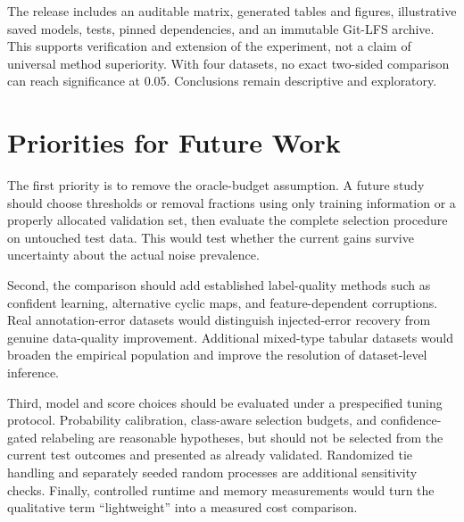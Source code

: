 The release includes an auditable matrix, generated tables and figures,
illustrative saved models, tests, pinned dependencies, and an immutable
Git-LFS archive. This supports verification and extension of the experiment,
not a claim of universal method superiority. With four datasets, no exact
two-sided comparison can reach significance at 0.05. Conclusions remain
descriptive and exploratory.

\section{Priorities for Future Work}
The first priority is to remove the oracle-budget assumption. A future study
should choose thresholds or removal fractions using only training information
or a properly allocated validation set, then evaluate the complete selection
procedure on untouched test data. This would test whether the current gains
survive uncertainty about the actual noise prevalence.

Second, the comparison should add established label-quality methods such as
confident learning, alternative cyclic maps, and feature-dependent corruptions.
Real annotation-error datasets would distinguish injected-error recovery from
genuine data-quality improvement. Additional mixed-type tabular datasets
would broaden the empirical population and improve the resolution of
dataset-level inference.

Third, model and score choices should be evaluated under a prespecified tuning
protocol. Probability calibration, class-aware selection budgets, and
confidence-gated relabeling are reasonable hypotheses, but should not be
selected from the current test outcomes and presented as already validated.
Randomized tie handling and separately seeded random processes are additional
sensitivity checks. Finally, controlled runtime and memory measurements
would turn the qualitative term ``lightweight'' into a measured cost comparison.

